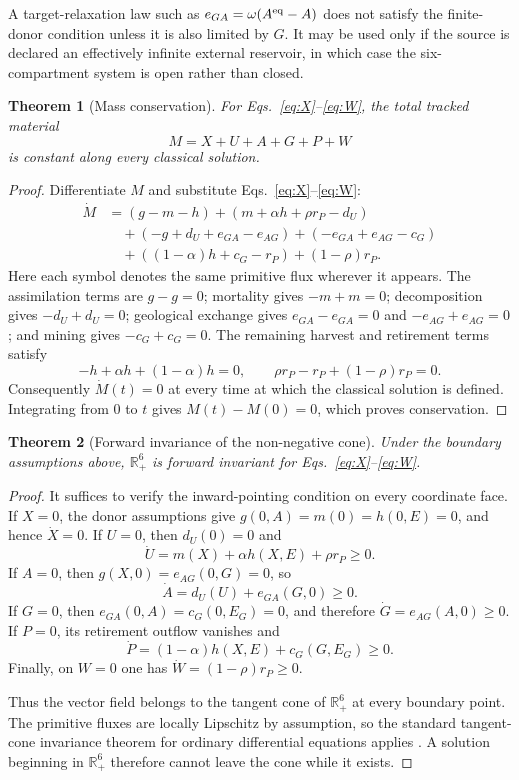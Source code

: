 \documentclass[11pt]{article}
\newtheorem{theorem}{Theorem}
\newcommand{\R}{\mathbb R}
\begin{document}
A target-relaxation law such as $e_{GA}=\omega(A^{\rm eq}-A)$ does not satisfy the finite-donor condition unless it is also limited by $G$. It may be used only if the source is declared an effectively infinite external reservoir, in which case the six-compartment system is open rather than closed.

\begin{theorem}[Mass conservation]
For Eqs.~\eqref{eq:X}--\eqref{eq:W}, the total tracked material
\[
M=X+U+A+G+P+W
\]
is constant along every classical solution.
\end{theorem}

\begin{proof}
Differentiate $M$ and substitute Eqs.~\eqref{eq:X}--\eqref{eq:W}:
\begin{align*}
\dot M
&=(g-m-h)
 +(m+\alpha h+\rho r_P-d_U)\\
&\quad+(-g+d_U+e_{GA}-e_{AG})
 +(-e_{GA}+e_{AG}-c_G)\\
&\quad+((1-\alpha)h+c_G-r_P)
 +(1-\rho)r_P.
\end{align*}
Here each symbol denotes the same primitive flux wherever it appears. The assimilation terms are $g-g=0$; mortality gives $-m+m=0$; decomposition gives $-d_U+d_U=0$; geological exchange gives $e_{GA}-e_{GA}=0$ and $-e_{AG}+e_{AG}=0$; and mining gives $-c_G+c_G=0$. The remaining harvest and retirement terms satisfy
\[
-h+\alpha h+(1-\alpha)h=0,
\qquad
\rho r_P-r_P+(1-\rho)r_P=0.
\]
Consequently $\dot M(t)=0$ at every time at which the classical solution is defined. Integrating from $0$ to $t$ gives $M(t)-M(0)=0$, which proves conservation.
\end{proof}

\begin{theorem}[Forward invariance of the non-negative cone]
Under the boundary assumptions above, $\R_+^6$ is forward invariant for Eqs.~\eqref{eq:X}--\eqref{eq:W}.
\end{theorem}

\begin{proof}
It suffices to verify the inward-pointing condition on every coordinate face. If $X=0$, the donor assumptions give $g(0,A)=m(0)=h(0,E)=0$, and hence $\dot X=0$. If $U=0$, then $d_U(0)=0$ and
\[
\dot U=m(X)+\alpha h(X,E)+\rho r_P\ge0.
\]
If $A=0$, then $g(X,0)=e_{AG}(0,G)=0$, so
\[
\dot A=d_U(U)+e_{GA}(G,0)\ge0.
\]
If $G=0$, then $e_{GA}(0,A)=c_G(0,E_G)=0$, and therefore $\dot G=e_{AG}(A,0)\ge0$. If $P=0$, its retirement outflow vanishes and
\[
\dot P=(1-\alpha)h(X,E)+c_G(G,E_G)\ge0.
\]
Finally, on $W=0$ one has $\dot W=(1-\rho)r_P\ge0$.

Thus the vector field belongs to the tangent cone of $\R_+^6$ at every boundary point. The primitive fluxes are locally Lipschitz by assumption, so the standard tangent-cone invariance theorem for ordinary differential equations applies \cite{aubin1991}. A solution beginning in $\R_+^6$ therefore cannot leave the cone while it exists.
\end{proof}
\end{document}
